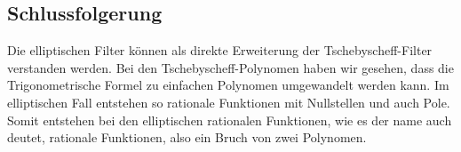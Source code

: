 \subsection{Schlussfolgerung}

Die elliptischen Filter können als direkte Erweiterung der Tschebyscheff-Filter verstanden werden.
Bei den Tschebyscheff-Polynomen haben wir gesehen, dass die Trigonometrische Formel zu einfachen Polynomen umgewandelt werden kann.
Im elliptischen Fall entstehen so rationale Funktionen mit Nullstellen und auch Pole.
Somit entstehen bei den elliptischen rationalen Funktionen, wie es der name auch deutet, rationale Funktionen, also ein Bruch von zwei Polynomen.



